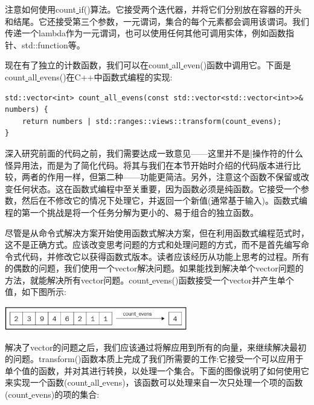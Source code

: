 注意如何使用count\underline{ }if()算法。它接受两个迭代器，并将它们分别放在容器的开头和结尾。它还接受第三个参数，一元谓词，集合的每个元素都会调用该谓词。我们传递一个lambda作为一元谓词，也可以使用任何其他可调用实体，例如函数指针、std::function等。 \par
现在有了独立的计数函数，我们可以在count\underline{ }all\underline{ }even()函数中调用它。下面是count\underline{ }all\underline{ }evens()在C++中函数式编程的实现: \par

\begin{lstlisting}[caption={}]
std::vector<int> count_all_evens(const std::vector<std::vector<int>>&
numbers) {
	return numbers | std::ranges::views::transform(count_evens);
}
\end{lstlisting}

深入研究前面的代码之前，我们需要达成一致意见——这里并不是|操作符的什么怪异用法，而是为了简化代码。将其与我们在本节开始时介绍的代码版本进行比较，两者的作用一样，但第二种——功能更简洁。另外，注意这个函数不保留或改变任何状态。这在函数式编程中至关重要，因为函数必须是纯函数。它接受一个参数，然后在不修改它的情况下处理它，并返回一个新值(通常基于输入)。函数式编程的第一个挑战是将一个任务分解为更小的、易于组合的独立函数。  \par
尽管是从命令式解决方案开始使用函数式解决方案，但在利用函数式编程范式时，这不是正确方式。应该改变思考问题的方式和处理问题的方式，而不是首先编写命令式代码，并修改它以获得函数式版本。读者应该经历从功能上思考的过程。所有的偶数的问题，我们使用一个vector解决问题。如果能找到解决单个vector问题的方法，就能解决所有vector问题。count\underline{ }evens()函数接受一个vector并产生单个值，如下图所示: \par

\begin{center}
	\includegraphics[width=0.6\textwidth]{content/Section-2/Chapter-7/2}
\end{center}

解决了vector的问题之后，我们应该通过将解应用到所有的向量，来继续解决最初的问题。transform()函数本质上完成了我们所需要的工作:它接受一个可以应用于单个值的函数，并对其进行转换，以处理一个集合。下面的图像说明了如何使用它来实现一个函数(count\underline{ }all\underline{ }evens)，该函数可以处理来自一次只处理一个项的函数(count\underline{ }evens)的项的集合: \par

